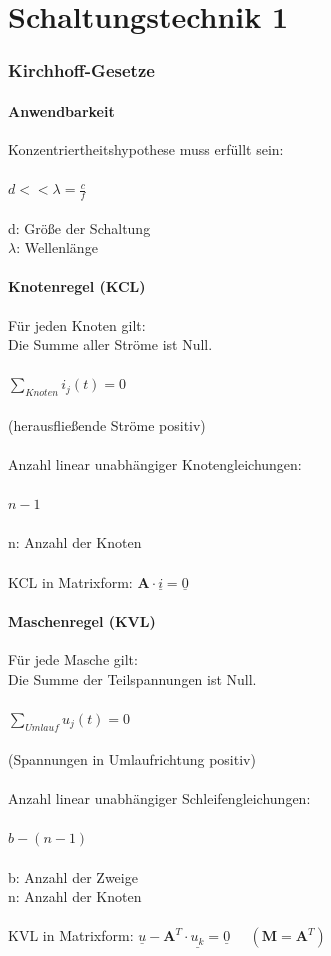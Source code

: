 \documentclass[a4paper,twocolumn,10pt]{article}
\begin{document}
\part*{Schaltungstechnik 1}

\section*{Kirchhoff-Gesetze}
\subsection*{Anwendbarkeit}
Konzentriertheitshypothese muss erfüllt sein:\\\\
$d<<\lambda = \frac{c}{f}$\\\\
d: Größe der Schaltung\\
$\lambda$: Wellenlänge

\subsection*{Knotenregel (KCL)}
Für jeden Knoten gilt:\\
Die Summe aller Ströme ist Null.\\\\
$\sum\limits_{Knoten}^{} i_j(t)=0$\\\\
(herausfließende Ströme positiv)\\\\
Anzahl linear unabhängiger Knotengleichungen:\\\\
$n-1$\\\\
n: Anzahl der Knoten\\\\
KCL in Matrixform: $\textbf{A}\cdot \underline{i}=\underline{0}$

\subsection*{Maschenregel (KVL)}
Für jede Masche gilt:\\
Die Summe der Teilspannungen ist Null.\\\\
$\sum\limits_{Umlauf}^{} u_j(t)=0$\\\\
(Spannungen in Umlaufrichtung positiv)\\\\
Anzahl linear unabhängiger Schleifengleichungen:\\\\
$b-(n-1)$\\\\
b: Anzahl der Zweige\\
n: Anzahl der Knoten\\\\
KVL in Matrixform: $\underline{u}-\textbf{A}^T\cdot \underline{u_k}=\underline{0}\;\;\;\;\;(\textbf{M}=\textbf{A}^T)$
\end{document}
